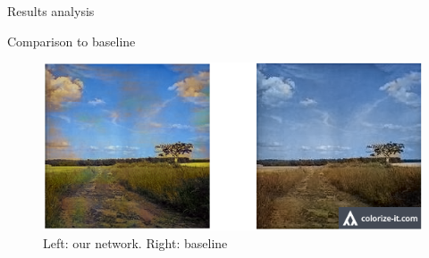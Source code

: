 \documentclass[final]{beamer}
\newlength{\onecolwid}
\begin{document}
\begin{frame}[t]
\begin{columns}[t]
\begin{column}{\onecolwid}
\begin{block}{Results analysis}
\end{block}

\begin{block}{Comparison to baseline}
\begin{figure}
\begin{center}
\includegraphics[width=0.7\linewidth]{compare}
\caption{Left: our network. Right: baseline}
\label{histogram}
\end{center}
\end{figure}


\end{block}


\end{column} %

\end{columns} %

\end{frame} %
\end{document}
